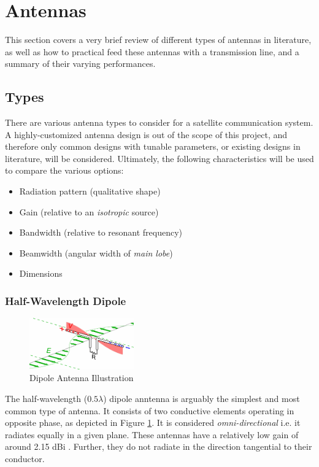 \graphicspath{{./figures}}

\section{Antennas}\label{sec:antenna_theory}

This section covers a very brief review of different types of antennas in literature, as well as how to practical feed these antennas with a transmission line, and a summary of their varying performances.

\subsection{Types}\label{sec:antenna_types}
There are various antenna types to consider for a satellite communication system. A highly-customized antenna design is out of the scope of this project, and therefore only common designs with tunable parameters, or existing designs in literature, will be considered. Ultimately, the following characteristics will be used to compare the various options:
\begin{itemize}
    \item Radiation pattern (qualitative shape)
    \item Gain (relative to an \textit{isotropic} source) 
    \item Bandwidth (relative to resonant frequency)
    \item Beamwidth (angular width of \textit{main lobe})
    \item Dimensions
\end{itemize}

\subsubsection{Half-Wavelength Dipole}
\begin{figure}[!htb]
  \centering
  \includegraphics[width=0.4\textwidth]{dipole}
  \caption{Dipole Antenna Illustration \cite{site-designingDipole}}
  \label{fig:dipole}
\end{figure}

The half-wavelength ($0.5 \lambda$) dipole anntenna is arguably the simplest and most common type of antenna. It consists of two conductive elements operating in opposite phase, as depicted in Figure \ref{fig:dipole}. It is considered \textit{omni-directional} i.e. it radiates equally in a given plane. These antennas have a relatively low gain of around 2.15 dBi \cite{site-antennaTheory}. Further, they do not radiate in the direction tangential to their conductor.

